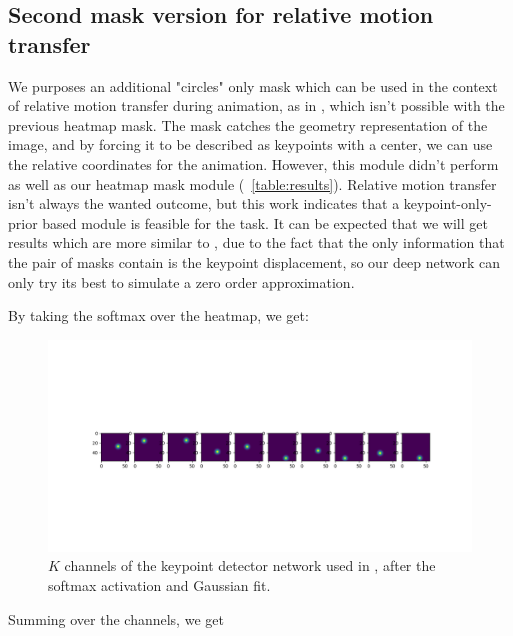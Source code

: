 \documentclass{article}
\begin{document}
\subsection{Second mask version for relative motion transfer}
We purposes an additional "circles" only mask
which can be used in the context
of relative motion transfer during animation, as in
\cite{siarohin2020order}, which isn't possible with the previous heatmap mask.
The mask catches the geometry representation \cite{wu2019transgaga} of the
image, and by forcing it to be described as keypoints with a center, we can
use the relative coordinates for the animation. However, this module didn't
perform as well as our heatmap mask module (~\ref{table:results}).
Relative motion transfer isn't always the wanted outcome, but this work
indicates that a keypoint-only-prior based module is feasible for the task.
It can be expected that we will get results which are more similar to
\cite{siarohin2019animating}, due to the fact that the only information
that the pair of masks contain is the keypoint displacement, so our deep
network can only try its best to simulate a zero order approximation.

By taking the softmax over the heatmap, we get:
\begin{figure}[ht]
\vskip 0.2in
\begin{center}
\centerline{\includegraphics[width=\columnwidth]{softmax_10kp}}
\caption{
$K$ channels of the keypoint detector network used in
\cite{siarohin2020order}, after the softmax activation and Gaussian fit.
}
\label{softmax-10kp}
\end{center}
\vskip -0.2in
\end{figure}

Summing over the channels, we get
\end{document}

